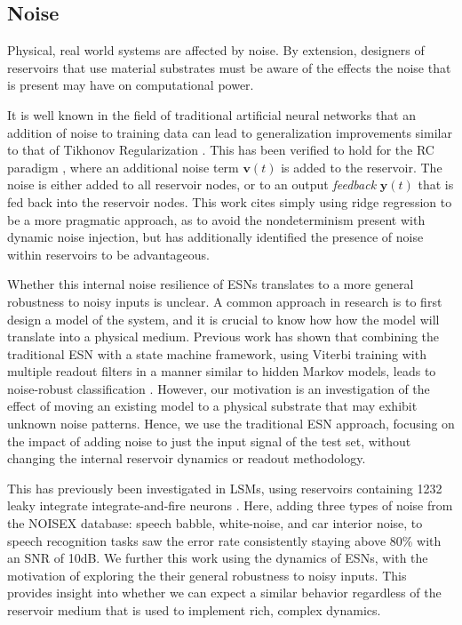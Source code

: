 \subsection{Noise}

Physical, real world systems are affected by noise. By extension, designers of
reservoirs that use material substrates must be aware of the effects the noise
that is present may have on computational power.

It is well known in the field of traditional artificial neural networks that an
addition of noise to training data can lead to generalization improvements
similar to that of Tikhonov Regularization \cite{bishop_training_1995}. This has
been verified to hold for the RC paradigm \cite{jaeger_echo_2001,
kurkova_stable_2008}, where an additional noise term $\mathbf{v}(t)$ is added to
the reservoir. The noise is either added to all reservoir nodes, or to an output
\textit{feedback} $\mathbf{y}(t)$ that is fed back into the reservoir
nodes. This work cites simply using ridge regression to be a more pragmatic
approach, as to avoid the nondeterminism present with dynamic noise injection,
but has additionally identified the presence of noise within reservoirs to be
advantageous.

Whether this internal noise resilience of ESNs translates to a more general
robustness to noisy inputs is unclear. A common approach in research is to first
design a model of the system, and it is crucial to know how how the model will
translate into a physical medium. Previous work has shown that combining the
traditional ESN with a state machine framework, using Viterbi training with
multiple readout filters in a manner similar to hidden Markov models, leads to
noise-robust classification \cite{skowronski_noise-robust_2007}. However, our
motivation is an investigation of the effect of moving an existing model to a
physical substrate that may exhibit unknown noise patterns. Hence, we use the
traditional ESN approach, focusing on the impact of adding noise to just the
input signal of the test set, without changing the internal reservoir dynamics
or readout methodology.

This has previously been investigated in LSMs, using reservoirs containing 1232
leaky integrate integrate-and-fire neurons
\cite{verstraeten_isolated_2005}. Here, adding three types of noise from the
NOISEX database: speech babble, white-noise, and car interior noise, to speech
recognition tasks saw the error rate consistently staying above 80\% with an SNR
of 10dB. We further this work using the dynamics of ESNs, with the motivation of
exploring the their general robustness to noisy inputs. This provides insight
into whether we can expect a similar behavior regardless of the reservoir medium
that is used to implement rich, complex dynamics.

